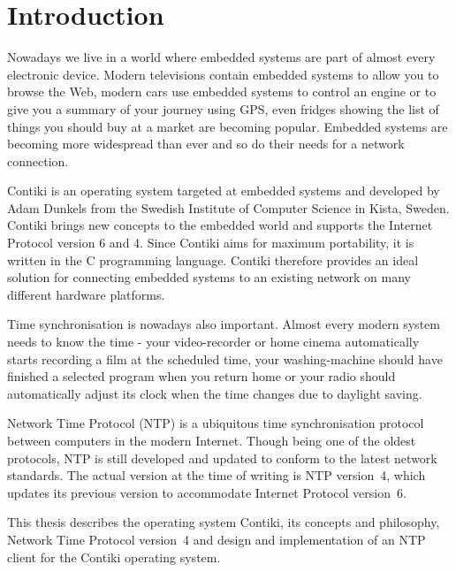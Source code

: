 
\chapter{Introduction}
Nowadays we live in a world where embedded systems are part of almost every electronic device.
Modern televisions contain embedded systems to allow you to browse the Web,
modern cars use embedded systems to control an engine or to give you a summary
of your journey using GPS, even fridges showing the list of things you should buy at a market are becoming popular.
Embedded systems are becoming more widespread than ever and so do
their needs for a network connection.

Contiki is an operating system targeted at embedded systems and
developed by Adam Dunkels from the Swedish Institute of Computer Science in Kista, Sweden.
Contiki brings new concepts to the embedded world and supports the Internet Protocol version 6 and 4.
Since Contiki aims for maximum portability, it is written in the C programming language.
Contiki therefore provides an ideal solution for connecting
embedded systems to an existing network on many different hardware platforms.

Time synchronisation is nowadays also important.
Almost every modern system needs to know the time -
your video-recorder or home cinema automatically starts recording a film at the scheduled time,
your washing-machine should have finished a selected program when you return home
or your radio should automatically adjust its clock when the time changes
due to daylight saving.

Network Time Protocol (NTP) is a ubiquitous time synchronisation protocol between computers in the modern Internet.
Though being one of the oldest protocols, NTP is still developed and updated to conform to the latest
network standards. The actual version at the time of writing is NTP version~4, which updates its previous version to
accommodate Internet Protocol version~6.

This thesis describes the operating system Contiki, its concepts and philosophy,
Network Time Protocol version~4 and design and implementation of an NTP client for the Contiki operating system.








